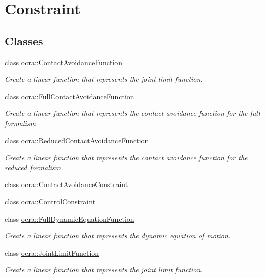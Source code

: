 \hypertarget{group__constraint}{}\section{Constraint}
\label{group__constraint}
\subsection*{Classes}
\begin{DoxyCompactItemize}
\item 
class \hyperlink{classocra_1_1ContactAvoidanceFunction}{ocra\+::\+Contact\+Avoidance\+Function}
\begin{DoxyCompactList}\small\item\em Create a linear function that represents the joint limit function. \end{DoxyCompactList}\item 
class \hyperlink{classocra_1_1FullContactAvoidanceFunction}{ocra\+::\+Full\+Contact\+Avoidance\+Function}
\begin{DoxyCompactList}\small\item\em Create a linear function that represents the contact avoidance function for the full formalism. \end{DoxyCompactList}\item 
class \hyperlink{classocra_1_1ReducedContactAvoidanceFunction}{ocra\+::\+Reduced\+Contact\+Avoidance\+Function}
\begin{DoxyCompactList}\small\item\em Create a linear function that represents the contact avoidance function for the reduced formalism. \end{DoxyCompactList}\item 
class \hyperlink{classocra_1_1ContactAvoidanceConstraint}{ocra\+::\+Contact\+Avoidance\+Constraint}
\item 
class \hyperlink{classocra_1_1ControlConstraint}{ocra\+::\+Control\+Constraint}
\item 
class \hyperlink{classocra_1_1FullDynamicEquationFunction}{ocra\+::\+Full\+Dynamic\+Equation\+Function}
\begin{DoxyCompactList}\small\item\em Create a linear function that represents the dynamic equation of motion. \end{DoxyCompactList}\item 
class \hyperlink{classocra_1_1JointLimitFunction}{ocra\+::\+Joint\+Limit\+Function}
\begin{DoxyCompactList}\small\item\em Create a linear function that represents the joint limit function. \end{DoxyCompactList}\item 

\end{DoxyCompactItemize}
